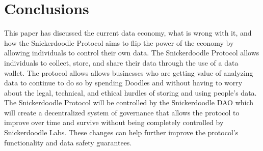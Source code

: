 \section{Conclusions}
This paper has discussed the current data economy, what is wrong with it, and how the Snickerdoodle Protocol aims to flip the power of the economy by allowing individuals to control their own data. The Snickerdoodle Protocol allows individuals to collect, store, and share their data through the use of a data wallet. The protocol allows allows businesses who are getting value of analyzing data to continue to do so by spending Doodles and without having to worry about the legal, technical, and ethical hurdles of storing and using people's data. The Snickerdoodle Protocol will be controlled by the Snickerdoodle DAO which will create a decentralized system of governance that allows the protocol to improve over time and survive without being completely controlled by Snickerdoodle Labs. These changes can help further improve the protocol's functionality and data safety guarantees. 